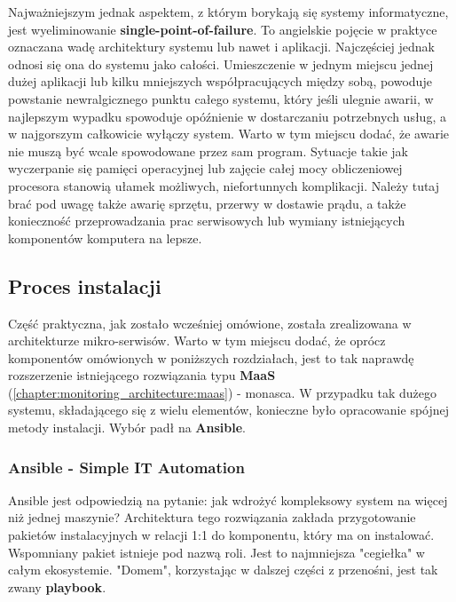 Najważniejszym jednak aspektem, z którym borykają się systemy informatyczne, jest wyeliminowanie \textbf{single-point-of-failure}.
To angielskie pojęcie w praktyce oznaczana wadę architektury systemu lub nawet i aplikacji. Najczęściej jednak odnosi się
ona do systemu jako całości. Umieszczenie w jednym miejscu jednej dużej aplikacji lub kilku mniejszych współpracujących 
między sobą, powoduje powstanie newralgicznego punktu całego systemu, który jeśli ulegnie awarii, w najlepszym wypadku spowoduje
opóźnienie w dostarczaniu potrzebnych usług, a w najgorszym całkowicie wyłączy system. Warto w tym miejscu dodać, że
awarie nie muszą być wcale spowodowane przez sam program. Sytuacje takie jak wyczerpanie się pamięci operacyjnej lub 
zajęcie całej mocy obliczeniowej procesora stanowią ułamek możliwych, niefortunnych komplikacji. Należy tutaj brać pod uwagę
także awarię sprzętu, przerwy w dostawie prądu, a także konieczność przeprowadzania prac serwisowych lub wymiany istniejących
komponentów komputera na lepsze.  

\subsection{Proces instalacji}
\label{chapter:application:architecture:installation}
    Część praktyczna, jak zostało wcześniej omówione, została zrealizowana w architekturze mikro-serwisów. Warto w tym miejscu dodać,
    że oprócz komponentów omówionych w poniższych rozdziałach, jest to tak naprawdę rozszerzenie istniejącego rozwiązania typu \textbf{MaaS}
    (\ref{chapter:monitoring_architecture:maas}) - monasca. W przypadku tak dużego systemu, składającego się z wielu elementów, 
    konieczne było opracowanie spójnej metody instalacji. Wybór padł na \textbf{Ansible}. 
    
    \subsubsection{Ansible - Simple IT Automation}
    \label{chapter:application:architecture:installation:ansible}
    Ansible jest odpowiedzią na pytanie: jak wdrożyć kompleksowy system na więcej niż jednej maszynie? Architektura tego rozwiązania
    zakłada przygotowanie pakietów instalacyjnych w relacji 1:1 do komponentu, który ma on instalować. Wspomniany pakiet istnieje pod nazwą roli.
    Jest to najmniejsza "cegiełka" w całym ekosystemie. "Domem", korzystając w dalszej części z przenośni, jest tak zwany \textbf{playbook}.
    
